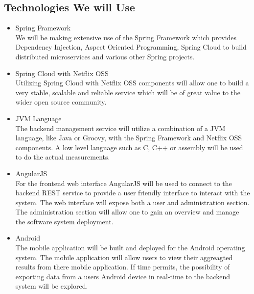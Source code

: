 \subsection{Technologies We will Use}
\begin{itemize}
	\item Spring Framework \\
		We will be making extensive use of the Spring Framework which provides Dependency Injection, Aspect Oriented Programming, Spring Cloud to build distributed microservices and various other Spring projects.
	\item Spring Cloud with Netflix OSS \\
		Utilizing Spring Cloud with Netflix OSS components will allow one to build a very stable, scalable and reliable service which will be of great value to the wider open source community.
	\item JVM Language \\
		The backend management service will utilize a combination of a JVM language, like Java or Groovy, with the Spring Framework and Netflix OSS components.   A low level language such as C, C++ or assembly will be used to do the actual measurements.
	\item AngularJS \\
		For the frontend web interface AngularJS will be used to connect to the backend REST service to provide a user friendly interface to interact with the system. The web interface will expose both a user and administration section. The administration section will allow one to gain an overview and manage the software system deployment.
	\item Android \\
		The mobile application will be built and deployed for the Android operating system. The mobile application will allow users to view their aggreagted results from there mobile application. If time permits, the possibility of exporting data from a users Android device in real-time to the backend system will be explored.
	\end{itemize}

